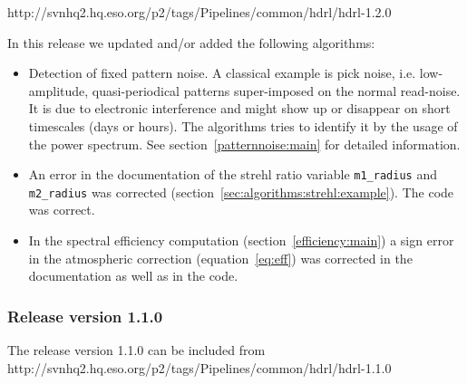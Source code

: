 http://svnhq2.hq.eso.org/p2/tags/Pipelines/common/hdrl/hdrl-1.2.0

In this release we updated and/or added the following algorithms:
\begin{itemize}
\item Detection of fixed pattern noise. A classical example is pick
  noise, i.e. low-amplitude, quasi-periodical patterns super-imposed
  on the normal read-noise. It is due to electronic interference and
  might show up or disappear on short timescales (days or hours). The
  algorithms tries to identify it by the usage of the power spectrum.
  See section~\ref{patternnoise:main} for detailed information.
\item An error in the documentation of the strehl ratio variable
  \verb+m1_radius+ and \verb+m2_radius+ was corrected
  (section~\ref{sec:algorithms:strehl:example}). The code was correct.
\item In the spectral efficiency computation
  (section~\ref{efficiency:main}) a sign error in the atmospheric
  correction (equation~\ref{eq:eff}) was corrected in the
  documentation as well as in the code.
\end{itemize}


\subsubsection{Release version 1.1.0}
The \HDRL release version 1.1.0 can be included from\\

http://svnhq2.hq.eso.org/p2/tags/Pipelines/common/hdrl/hdrl-1.1.0

